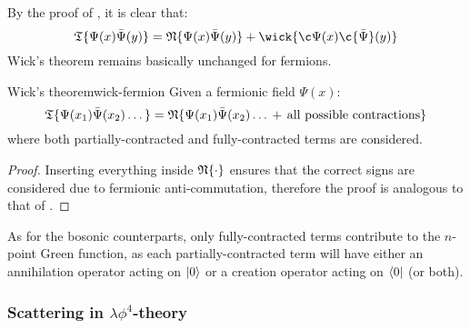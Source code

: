 By the proof of , it is clear that:
\begin{equation}
  \tempord\{\Psi(x) \bar{\Psi}(y)\} = \normord\{\Psi(x) \bar{\Psi}(y)\} + \wick{\c\Psi(x) \c{\bar{\Psi}}(y)}
\end{equation}
Wick's theorem remains basically unchanged for fermions.

\begin{theorem}{Wick's theorem}{wick-fermion}
  Given a fermionic field $ \Psi(x) $:
  \begin{equation}
    \mathfrak{T}\{\Psi(x_1) \bar{\Psi}(x_2) \dots\} = \mathfrak{N}\{\Psi(x_1) \bar{\Psi}(x_2) \dots \,+\, \text{all possible contractions}\}
  \end{equation}
  where both partially-contracted and fully-contracted terms are considered.
\end{theorem}

\begin{proofbox}
  \begin{proof}
    Inserting everything inside $ \mathfrak{N}\{\cdot\} $ ensures that the correct signs are considered due to fermionic anti-commutation, therefore the proof is analogous to that of .
  \end{proof}
\end{proofbox}

As for the bosonic counterparts, only fully-contracted terms contribute to the $ n $-point Green function, as each partially-contracted term will have either an annihilation operator acting on $ \ket{0} $ or a creation operator acting on $ \bra{0} $ (or both).

\subsubsection{Scattering in $ \lambda \phi^4 $-theory}

